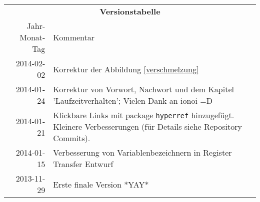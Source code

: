 \begin{table}[htp]
\centering
\begin{tabularx}{\columnwidth}{rp{}}
\multicolumn{2}{c}{\textbf{Versionstabelle}} \\
Jahr-Monat-Tag & Kommentar \\ \hline
2014-02-02 & Korrektur der Abbildung \ref{verschmelzung} \\
2014-01-24 & Korrektur von Vorwort, Nachwort und dem Kapitel 'Laufzeitverhalten'; Vielen Dank an ionoi =D \\
2014-01-21 & Klickbare Links mit package \texttt{hyperref} hinzugefügt.
                     Kleinere Verbesserungen (für Details siehe Repository Commits).
\\
2014-01-15 & Verbesserung von Variablenbezeichnern in Register Transfer Entwurf \\
2013-11-29 & Erste finale Version *YAY* \\
\end{tabularx}
\end{table}